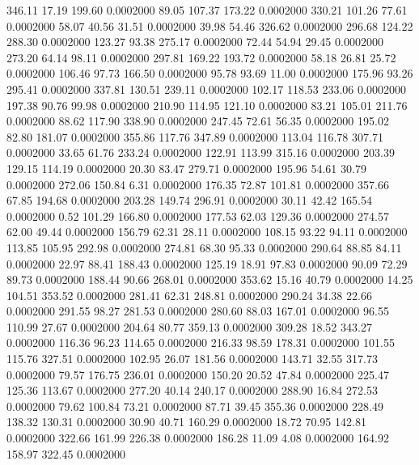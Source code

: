  346.11   17.19  199.60   0.0002000
  89.05  107.37  173.22   0.0002000
 330.21  101.26   77.61   0.0002000
  58.07   40.56   31.51   0.0002000
  39.98   54.46  326.62   0.0002000
 296.68  124.22  288.30   0.0002000
 123.27   93.38  275.17   0.0002000
  72.44   54.94   29.45   0.0002000
 273.20   64.14   98.11   0.0002000
 297.81  169.22  193.72   0.0002000
  58.18   26.81   25.72   0.0002000
 106.46   97.73  166.50   0.0002000
  95.78   93.69   11.00   0.0002000
 175.96   93.26  295.41   0.0002000
 337.81  130.51  239.11   0.0002000
 102.17  118.53  233.06   0.0002000
 197.38   90.76   99.98   0.0002000
 210.90  114.95  121.10   0.0002000
  83.21  105.01  211.76   0.0002000
  88.62  117.90  338.90   0.0002000
 247.45   72.61   56.35   0.0002000
 195.02   82.80  181.07   0.0002000
 355.86  117.76  347.89   0.0002000
 113.04  116.78  307.71   0.0002000
  33.65   61.76  233.24   0.0002000
 122.91  113.99  315.16   0.0002000
 203.39  129.15  114.19   0.0002000
  20.30   83.47  279.71   0.0002000
 195.96   54.61   30.79   0.0002000
 272.06  150.84    6.31   0.0002000
 176.35   72.87  101.81   0.0002000
 357.66   67.85  194.68   0.0002000
 203.28  149.74  296.91   0.0002000
  30.11   42.42  165.54   0.0002000
   0.52  101.29  166.80   0.0002000
 177.53   62.03  129.36   0.0002000
 274.57   62.00   49.44   0.0002000
 156.79   62.31   28.11   0.0002000
 108.15   93.22   94.11   0.0002000
 113.85  105.95  292.98   0.0002000
 274.81   68.30   95.33   0.0002000
 290.64   88.85   84.11   0.0002000
  22.97   88.41  188.43   0.0002000
 125.19   18.91   97.83   0.0002000
  90.09   72.29   89.73   0.0002000
 188.44   90.66  268.01   0.0002000
 353.62   15.16   40.79   0.0002000
  14.25  104.51  353.52   0.0002000
 281.41   62.31  248.81   0.0002000
 290.24   34.38   22.66   0.0002000
 291.55   98.27  281.53   0.0002000
 280.60   88.03  167.01   0.0002000
  96.55  110.99   27.67   0.0002000
 204.64   80.77  359.13   0.0002000
 309.28   18.52  343.27   0.0002000
 116.36   96.23  114.65   0.0002000
 216.33   98.59  178.31   0.0002000
 101.55  115.76  327.51   0.0002000
 102.95   26.07  181.56   0.0002000
 143.71   32.55  317.73   0.0002000
  79.57  176.75  236.01   0.0002000
 150.20   20.52   47.84   0.0002000
 225.47  125.36  113.67   0.0002000
 277.20   40.14  240.17   0.0002000
 288.90   16.84  272.53   0.0002000
  79.62  100.84   73.21   0.0002000
  87.71   39.45  355.36   0.0002000
 228.49  138.32  130.31   0.0002000
  30.90   40.71  160.29   0.0002000
  18.72   70.95  142.81   0.0002000
 322.66  161.99  226.38   0.0002000
 186.28   11.09    4.08   0.0002000
 164.92  158.97  322.45   0.0002000
